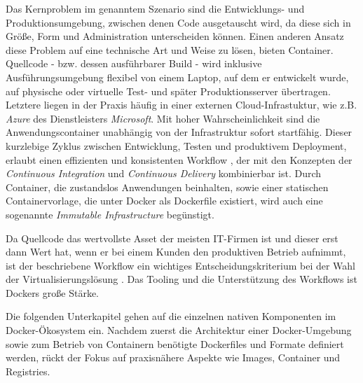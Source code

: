 \documentclass[../main.tex]{subfiles}
\begin{document}
    Das Kernproblem im genanntem Szenario sind die Entwicklungs- und Produktionsumgebung, zwischen denen Code ausgetauscht wird, da diese sich in Größe, Form und Administration unterscheiden können. Einen anderen Ansatz diese Problem auf eine technische Art und Weise zu lösen, bieten Container. Quellcode - bzw. dessen ausführbarer Build - wird inklusive Ausführungsumgebung flexibel von einem Laptop, auf dem er entwickelt wurde, auf physische oder virtuelle Test- und später Produktionsserver übertragen. Letztere liegen in der Praxis häufig in einer externen Cloud-Infrastuktur, wie z.B. \emph{Azure} des Dienstleisters \emph{Microsoft}. Mit hoher Wahrscheinlichkeit sind die Anwendungscontainer unabhängig von der Infrastruktur sofort startfähig. Dieser kurzlebige Zyklus zwischen Entwicklung, Testen und produktivem Deployment, erlaubt einen effizienten und konsistenten Workflow \cite[S.8+12]{dockerBook}, der mit den Konzepten der \emph{Continuous Integration} und \emph{Continuous Delivery} kombinierbar ist. Durch Container, die zustandslos Anwendungen beinhalten, sowie einer statischen Containervorlage, die unter Docker als Dockerfile existiert, wird auch eine sogenannte \emph{Immutable Infrastructure} begünstigt.

    Da Quellcode das wertvollste Asset der meisten \acrshort{IT}-Firmen ist und dieser erst dann Wert hat, wenn er bei einem Kunden den produktiven Betrieb aufnimmt, ist der beschriebene Workflow ein wichtiges Entscheidungskriterium bei der Wahl der Virtualisierungslösung \cite[S.1]{dockerIntroIEEE}. Das Tooling und die Unterstützung des Workflows ist Dockers große Stärke.


		Die folgenden Unterkapitel gehen auf die einzelnen nativen Komponenten im Docker-Ökosystem ein. Nachdem zuerst die Architektur einer Docker-Umgebung sowie zum Betrieb von Containern benötigte Dockerfiles und Formate definiert werden, rückt der Fokus auf praxisnähere Aspekte wie Images, Container und Registries.


\end{document}
